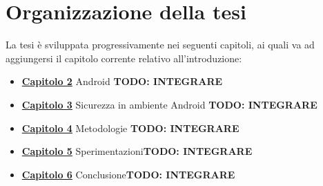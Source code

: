 
\section{Organizzazione della tesi}
\label{sec:intro4}
La tesi è sviluppata progressivamente nei seguenti capitoli, ai quali va ad aggiungersi il capitolo corrente relativo all'introduzione:


\begin{itemize}
    \item\hyperref[chap:cap2]{\textbf{Capitolo 2}} Android \textbf{TODO: INTEGRARE}
    \item\hyperref[chap:cap3]{\textbf{Capitolo 3}} Sicurezza in ambiente Android \textbf{TODO: INTEGRARE}
    \item\hyperref[chap:cap4]{\textbf{Capitolo 4}} Metodologie \textbf{TODO: INTEGRARE}
    \item\hyperref[chap:sperim]{\textbf{Capitolo 5}} Sperimentazioni\textbf{TODO: INTEGRARE}
    \item\hyperref[chap:Conclusioni]{\textbf{Capitolo 6}} Conclusione\textbf{TODO: INTEGRARE}
\end{itemize}

